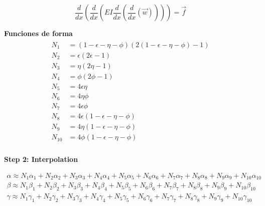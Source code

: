 \documentclass{article}
\begin{document}
{\Huge

\begin{equation*}
    \frac{d}{dx}\left(\frac{d}{dx}\left(EI\frac{d}{dx}\left(\frac{d}{dx}\left(\vec{w}\right)\right)\right)\right)=\vec{f}
\end{equation*}
}
\vspace{15mm} %

\textbf{Funciones de forma}
\begin{align}
    \begin{split}
        N_1 &= (1-\epsilon-\eta-\phi)(2(1-\epsilon-\eta-\phi)-1)  \\
        N_2 &= \epsilon(2\epsilon-1) \\
        N_3 &= \eta (2\eta-1) \\
        N_4 &= \phi(2\phi-1) \\
        N_5 &= 4\epsilon\eta \\
        N_6 &= 4\eta\phi \\
        N_7 &= 4\epsilon\phi \\
        N_8 &= 4\epsilon(1-\epsilon-\eta-\phi) \\
        N_9 &= 4\eta(1-\epsilon-\eta-\phi) \\
        N_{10} &= 4\phi(1-\epsilon-\eta-\phi) \\
    \end{split}
\end{align}


\vspace{15mm} %
\textbf{Step 2: Interpolation}

\begin{gather}
  \label{eq-tfrac}
    \alpha\approx N_1\alpha_1+N_2\alpha_2+N_3\alpha_3+N_4\alpha_4+N_5\alpha_5+N_6\alpha_6+N_7\alpha_7+N_8\alpha_8+N_9\alpha_9+N_{10}\alpha_{10}\\
    \beta\approx N_1\beta_1+N_2\beta_2+N_3\beta_3+N_4\beta_4+N_5\beta_5+N_6\beta_6+N_7\beta_7+N_8\beta_8+N_9\beta_9+N_{10}\beta_{10}\\
    \gamma\approx N_1\gamma_1+N_2\gamma_2+N_3\gamma_3+N_4\gamma_4+N_5\gamma_5+N_6\gamma_6+N_7\gamma_7+N_8\gamma_8+N_9\gamma_9+N_{10}\gamma_{10}
\end{gather}
\end{document}
